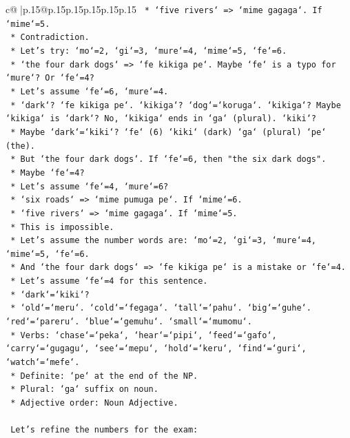 \documentclass{article}
\begin{document}
{\begin{supertabular}{c@{$\;$}|p{.15\linewidth}@{}p{.15\linewidth}p{.15\linewidth}p{.15\linewidth}p{.15\linewidth}p{.15\linewidth}}
{{{\texttt{        *   `five rivers` => `mime gagaga`. If `mime`=5.} \\
\texttt{        *   Contradiction.} \\
\texttt{    *   Let's try: `mo`=2, `gi`=3, `mure`=4, `mime`=5, `fe`=6.} \\
\texttt{    *   `the four dark dogs` => `fe kikiga pe`. Maybe `fe` is a typo for `mure`? Or `fe`=4?} \\
\texttt{    *   Let's assume `fe`=6, `mure`=4.} \\
\texttt{    *   `dark`? `fe kikiga pe`. `kikiga`? `dog`=`koruga`. `kikiga`? Maybe `kikiga` is `dark`? No, `kikiga` ends in `ga` (plural). `kiki`?} \\
\texttt{    *   Maybe `dark`=`kiki`? `fe` (6) `kiki` (dark) `ga` (plural) `pe` (the).} \\
\texttt{    *   But `the four dark dogs`. If `fe`=6, then "the six dark dogs".} \\
\texttt{    *   Maybe `fe`=4?} \\
\texttt{    *   Let's assume `fe`=4, `mure`=6?} \\
\texttt{    *   `six roads` => `mime pumuga pe`. If `mime`=6.} \\
\texttt{    *   `five rivers` => `mime gagaga`. If `mime`=5.} \\
\texttt{    *   This is impossible.} \\
\texttt{    *   Let's assume the number words are: `mo`=2, `gi`=3, `mure`=4, `mime`=5, `fe`=6.} \\
\texttt{    *   And `the four dark dogs` => `fe kikiga pe` is a mistake or `fe`=4.} \\
\texttt{    *   Let's assume `fe`=4 for this sentence.} \\
\texttt{    *   `dark`=`kiki`?} \\
\texttt{    *   `old`=`meru`. `cold`=`fegaga`. `tall`=`pahu`. `big`=`guhe`. `red`=`pareru`. `blue`=`gemuhu`. `small`=`mumomu`.} \\
\texttt{    *   Verbs: `chase`=`peka`, `hear`=`pipi`, `feed`=`gafo`, `carry`=`gugagu`, `see`=`mepu`, `hold`=`keru`, `find`=`guri`, `watch`=`mefe`.} \\
\texttt{    *   Definite: `pe` at the end of the NP.} \\
\texttt{    *   Plural: `ga` suffix on noun.} \\
\texttt{    *   Adjective order: Noun Adjective.} \\
\\ 
\texttt{    Let's refine the numbers for the exam:} \\
}}}
\end{supertabular}}
\end{document}

